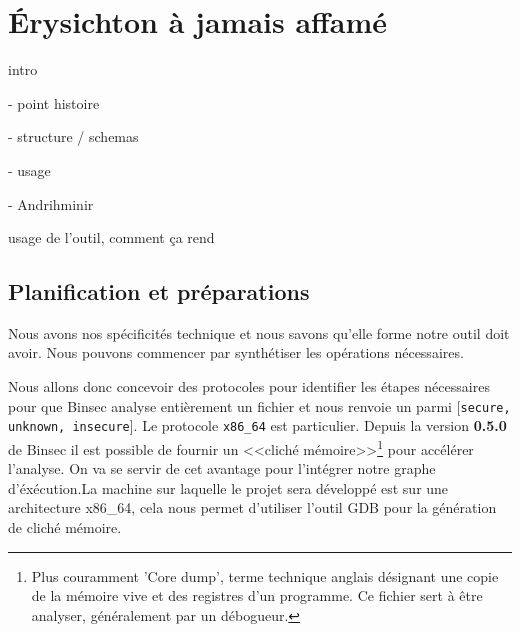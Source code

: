 \chapter{Érysichton à jamais affamé}
\label{chap:erysichtonUsage}

intro

- point histoire

- structure / schemas

- usage

- Andrihminir

usage de l'outil, comment ça rend

\section{Planification et préparations}

Nous avons nos spécificités technique et nous savons qu'elle forme notre outil doit avoir. Nous pouvons commencer par synthétiser les opérations nécessaires.\smallbreak

Nous allons donc concevoir des protocoles pour identifier les étapes nécessaires pour que Binsec analyse entièrement un fichier et nous renvoie un parmi [\texttt{secure, unknown, insecure}]. Le protocole \texttt{x86\_64} est particulier. Depuis la version \textbf{0.5.0} de Binsec il est possible de fournir un <<cliché mémoire>>\footnote{Plus couramment 'Core dump', terme technique anglais désignant une copie de la mémoire vive et des registres d'un programme. Ce fichier sert à être analyser, généralement par un débogueur.} pour accélérer l'analyse. On va se servir de cet avantage pour l'intégrer notre graphe d'éxécution.La machine sur laquelle le projet sera développé est sur une architecture x86\_64, cela nous permet d'utiliser l'outil GDB pour la génération de cliché mémoire.\medbreak

